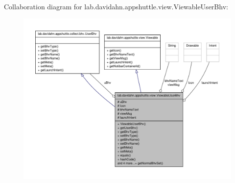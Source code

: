\-Collaboration diagram for lab.\-davidahn.\-appshuttle.\-view.\-Viewable\-User\-Bhv\-:
\nopagebreak
\begin{figure}[H]
\begin{center}
\leavevmode
\includegraphics[width=350pt]{classlab_1_1davidahn_1_1appshuttle_1_1view_1_1_viewable_user_bhv__coll__graph}
\end{center}
\end{figure}
